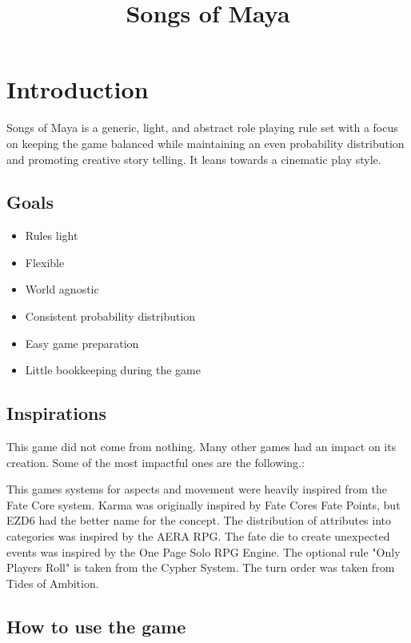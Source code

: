 \documentclass[11pt]{article}
\date{}
\title{Songs of Maya}
\begin{document}
\maketitle
\tableofcontents

{

\newpage
\section{Introduction}
\label{sec:org3be59cd}

Songs of Maya is a generic, light, and abstract role playing rule set with a focus on keeping the game balanced while maintaining an even probability distribution and promoting creative story telling. It leans towards a cinematic play style.
\subsection{Goals}
\label{sec:org1483525}

\begin{itemize}
\item Rules light
\item Flexible
\item World agnostic
\item Consistent probability distribution
\item Easy game preparation
\item Little bookkeeping during the game
\end{itemize}
\subsection{Inspirations}
\label{sec:org0a67507}

This game did not come from nothing. Many other games had an impact on its creation. Some of the most impactful ones are the following.:

This games systems for aspects and movement were heavily inspired from the Fate Core system.
Karma was originally inspired by Fate Cores Fate Points, but EZD6 had the better name for the concept.
The distribution of attributes into categories was inspired by the AERA RPG.
The fate die to create unexpected events was inspired by the One Page Solo RPG Engine.
The optional rule "Only Players Roll" is taken from the Cypher System.
The turn order was taken from Tides of Ambition.
\subsection{How to use the game}
\label{sec:orgff1dbd3}

}
\end{document}
